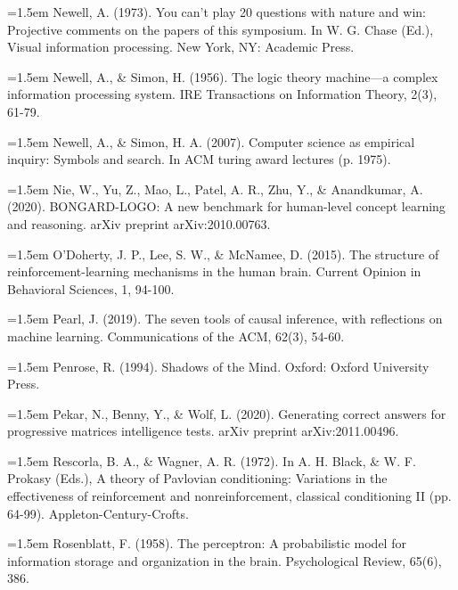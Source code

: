 \hangindent=1.5em
Newell, A. (1973).
You can't play 20 questions with nature and win:
Projective comments on the papers of this symposium.
In W. G. Chase (Ed.), Visual information processing.
New York, NY: Academic Press.
\par

\hangindent=1.5em
Newell, A., \& Simon, H. (1956).
The logic theory machine---a complex information processing system.
IRE Transactions on Information Theory, 2(3), 61-79.
\par

\hangindent=1.5em
Newell, A., \& Simon, H. A. (2007).
Computer science as empirical inquiry: Symbols and search.
In ACM turing award lectures (p. 1975).
\par

\hangindent=1.5em
Nie, W., Yu, Z., Mao, L., Patel, A. R., Zhu, Y.,
\& Anandkumar, A. (2020).
BONGARD-LOGO: A new benchmark for human-level concept learning
and reasoning.
arXiv preprint arXiv:2010.00763.
\par

\hangindent=1.5em
O'Doherty, J. P., Lee, S. W., \& McNamee, D. (2015).
The structure of reinforcement-learning mechanisms in the human brain.
Current Opinion in Behavioral Sciences, 1, 94-100.
\par

\hangindent=1.5em
Pearl, J. (2019).
The seven tools of causal inference, with reflections on
machine learning.
Communications of the ACM, 62(3), 54-60.
\par

\hangindent=1.5em
Penrose, R. (1994).
Shadows of the Mind.
Oxford: Oxford University Press.
\par

\hangindent=1.5em
Pekar, N., Benny, Y., \& Wolf, L. (2020).
Generating correct answers for progressive matrices intelligence tests.
arXiv preprint arXiv:2011.00496.
\par

\hangindent=1.5em
Rescorla, B. A., \& Wagner, A. R. (1972).
In A. H. Black, \& W. F. Prokasy (Eds.),
A theory of Pavlovian conditioning:
Variations in the effectiveness of reinforcement and nonreinforcement,
classical conditioning II (pp. 64-99).
Appleton-Century-Crofts.
\par

\hangindent=1.5em
Rosenblatt, F. (1958).
The perceptron: A probabilistic model for information storage and
organization in the brain.
Psychological Review, 65(6), 386.
\par

